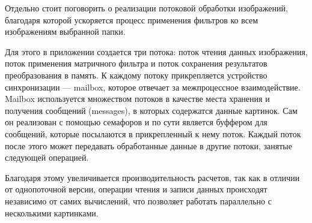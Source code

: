 \vspace{14px}
Отдельно стоит поговорить о реализации потоковой обработки изображений, благодаря которой ускоряется процесс применения фильтров ко всем
изображениям выбранной папки.

Для этого в приложении создается три потока: поток чтения данных изображения, поток применения матричного фильтра и поток сохранения 
результатов преобразования в память. К каждому потоку прикрепляется устройство синхронизации --- mailbox, которое отвечает за межпроцессное 
взаимодействие. Mailbox\cite{mailbox} используется множеством потоков в качестве места хранения и получения сообщений (messages), 
в которых содержатся данные картинок. Сам он реализован с помощью семафоров и по сути является буффером для сообщений, которые посылаются 
в прикрепленный к нему поток. Каждый поток после этого может передавать обработанные данные в другие потоки, занятые следующей операцией.

Благодаря этому увеличивается производительность расчетов, так как в отличии от однопоточной версии, операции чтения и записи данных 
происходят независимо от самих вычислений, что позволяет работать параллельно с несколькими картинками.

\pagebreak